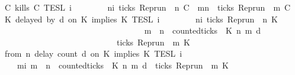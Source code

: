 \begin{isabellebody}
{\isacharbar}\ {\isacartoucheopen}{\isasymlbrakk}\ C\ kills\ C\ {\isasymrbrakk}\isactrlsub T\isactrlsub E\isactrlsub S\isactrlsub L\isactrlbsup {\isasymge}\ i\isactrlesup \ {\isacharequal}\isanewline
\ \ \ \ \ \ {\isacharbraceleft}{\isasymrho}{\isachardot}\ {\isasymforall}n{\isasymge}i{\isachardot}\ ticks\ {\isacharparenleft}{\isacharparenleft}Rep{\isacharunderscore}run\ {\isasymrho}{\isacharparenright}\ n\ C\ {\isasymlongrightarrow}\ {\isacharparenleft}{\isasymforall}m{\isasymge}n{\isachardot}\ {\isasymnot}\ ticks\ {\isacharparenleft}{\isacharparenleft}Rep{\isacharunderscore}run\ {\isasymrho}{\isacharparenright}\ m\ C\isanewline
{\isacharbar}\ {\isacartoucheopen}{\isasymlbrakk}\ K{}\ delayed\ by\ d\ on\ K{}\ implies\ K{}\ {\isasymrbrakk}\isactrlsub T\isactrlsub E\isactrlsub S\isactrlsub L\isactrlbsup {\isasymge}\ i\isactrlesup \ {\isacharequal}\isanewline
\ \ \ \ \ \ {\isacharbraceleft}{\isasymrho}{\isachardot}\ {\isasymforall}n{\isasymge}i{\isachardot}\ ticks\ {\isacharparenleft}{\isacharparenleft}Rep{\isacharunderscore}run\ {\isasymrho}{\isacharparenright}\ n\ K{}{\isacharparenright}\ {\isasymlongrightarrow}\isanewline
\ \ \ \ \ \ \ \ \ \ \ \ \ \ \ \ \ {\isacharparenleft}\isanewline
\ \ \ \ \ \ \ \ \ \ \ \ \ \ \ \ \ \ {\isasymforall}m\ {\isasymge}\ n{\isachardot}\ \ counted{\isacharunderscore}ticks\ {\isasymrho}\ K{}\ n\ m\ d\isanewline
\ \ \ \ \ \ \ \ \ \ \ \ \ \ \ \ \ \ \ \ \ \ \ \ \ \ \ \ {\isasymlongrightarrow}\ ticks\ {\isacharparenleft}{\isacharparenleft}Rep{\isacharunderscore}run\ {\isasymrho}{\isacharparenright}\ m\ K{}{\isacharparenright}\isanewline
\ \ \ \ \ \ \ \ \ \ \ \ \ \ \ \ \ {\isacharparenright}\isanewline
\ \ \ \ \ \ {\isacharbraceright}{\isacartoucheclose}\isanewline
{\isacharbar}\ {\isacartoucheopen}{\isasymlbrakk}\ from\ n\ delay\ count\ d\ on\ K{}\ implies\ K{}\ {\isasymrbrakk}\isactrlsub T\isactrlsub E\isactrlsub S\isactrlsub L\isactrlbsup {\isasymge}\ i\isactrlesup \ {\isacharequal}\isanewline
\ \ \ \ {\isacharbraceleft}{\isasymrho}{\isachardot}\ {\isasymforall}m{\isasymge}i{\isachardot}\ {\isacharparenleft}m\ {\isasymge}\ n\ {\isasymand}\ counted{\isacharunderscore}ticks\ {\isasymrho}\ K{}\ n\ m\ d{\isacharparenright}\ {\isasymlongrightarrow}\ ticks\ {\isacharparenleft}{\isacharparenleft}Rep{\isacharunderscore}run\ {\isasymrho}{\isacharparenright}\ m\ K{}{\isacharparenright}{\isacharbraceright}\isanewline

\end{isabellebody}
